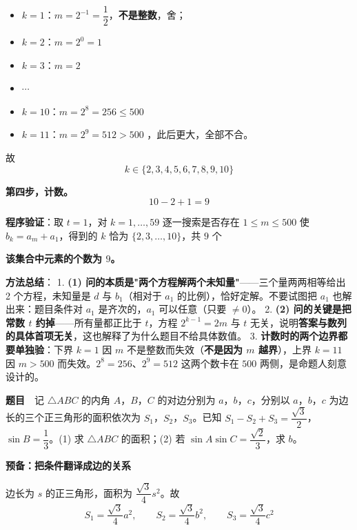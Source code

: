 \begin{itemize}
\item $k=1$：$m=2^{-1}=\dfrac12$，\textbf{不是整数}，舍；
\item $k=2$：$m=2^{0}=1$ 
\item $k=3$：$m=2$ 
\item $\cdots$
\item $k=10$：$m=2^{8}=256\le500$ 
\item $k=11$：$m=2^{9}=512>500$ ，此后更大，全部不合。
\end{itemize}

故
\[k\in\{2,3,4,5,6,7,8,9,10\}\]

\textbf{第四步，计数。}
\[10-2+1=9\]

\textbf{程序验证}：取 $t=1$，对 $k=1,\dots,59$ 逐一搜索是否存在 $1\le m\le500$ 使 $b_k=a_m+a_1$，得到的 $k$ 恰为 $\{2,3,\dots,10\}$，共 $9$ 个 

\textbf{该集合中元素的个数为 $9$。}

\begin{gktip}
\textbf{方法总结}：
1. \textbf{(1) 问的本质是"两个方程解两个未知量"}——三个量两两相等给出 2 个方程，未知量是 $d$ 与 $b_1$（相对于 $a_1$ 的比例），恰好定解。不要试图把 $a_1$ 也解出来：题目条件对 $a_1$ 是齐次的，$a_1$ 可以任意（只要 $\ne0$）。
2. \textbf{(2) 问的关键是把常数 $t$ 约掉}——所有量都正比于 $t$，方程 $2^{k-1}=2m$ 与 $t$ 无关，说明\textbf{答案与数列的具体首项无关}，这也解释了为什么题目不给具体数值。
3. \textbf{计数时的两个边界都要单独验}：下界 $k=1$ 因 $m$ 不是整数而失效（\textbf{不是因为 $m$ 越界}），上界 $k=11$ 因 $m>500$ 而失效。$2^{8}=256$、$2^{9}=512$ 这两个数卡在 $500$ 两侧，是命题人刻意设计的。
\end{gktip}

\par\medskip


\textbf{题目}　记 $\triangle ABC$ 的内角 $A$，$B$，$C$ 的对边分别为 $a$，$b$，$c$，分别以 $a$，$b$，$c$ 为边长的三个正三角形的面积依次为 $S_1$，$S_2$，$S_3$。已知 $S_1-S_2+S_3=\dfrac{\sqrt3}2$，$\sin B=\dfrac13$。(1) 求 $\triangle ABC$ 的面积；(2) 若 $\sin A\sin C=\dfrac{\sqrt2}3$，求 $b$。

\par\medskip

\textbf{预备：把条件翻译成边的关系}

边长为 $s$ 的正三角形，面积为 $\dfrac{\sqrt3}4s^{2}$。故
\[S_1=\frac{\sqrt3}4a^{2},\qquad S_2=\frac{\sqrt3}4b^{2},\qquad S_3=\frac{\sqrt3}4c^{2}\]


